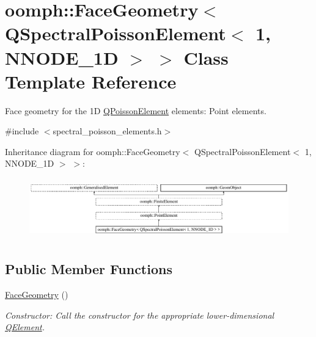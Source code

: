 \hypertarget{classoomph_1_1FaceGeometry_3_01QSpectralPoissonElement_3_011_00_01NNODE__1D_01_4_01_4}{}\section{oomph\+:\+:Face\+Geometry$<$ Q\+Spectral\+Poisson\+Element$<$ 1, N\+N\+O\+D\+E\+\_\+1D $>$ $>$ Class Template Reference}
\label{classoomph_1_1FaceGeometry_3_01QSpectralPoissonElement_3_011_00_01NNODE__1D_01_4_01_4}


Face geometry for the 1D \hyperlink{classoomph_1_1QPoissonElement}{Q\+Poisson\+Element} elements\+: Point elements.  




{\ttfamily \#include $<$spectral\+\_\+poisson\+\_\+elements.\+h$>$}

Inheritance diagram for oomph\+:\+:Face\+Geometry$<$ Q\+Spectral\+Poisson\+Element$<$ 1, N\+N\+O\+D\+E\+\_\+1D $>$ $>$\+:\begin{figure}[H]
\begin{center}
\leavevmode
\includegraphics[height=2.647754cm]{classoomph_1_1FaceGeometry_3_01QSpectralPoissonElement_3_011_00_01NNODE__1D_01_4_01_4}
\end{center}
\end{figure}
\subsection*{Public Member Functions}
\begin{DoxyCompactItemize}
\item 
\hyperlink{classoomph_1_1FaceGeometry_3_01QSpectralPoissonElement_3_011_00_01NNODE__1D_01_4_01_4_a3b8269193296e7a366f3d077443379be}{Face\+Geometry} ()
\begin{DoxyCompactList}\small\item\em Constructor\+: Call the constructor for the appropriate lower-\/dimensional \hyperlink{classoomph_1_1QElement}{Q\+Element}. \end{DoxyCompactList}\end{DoxyCompactItemize}
